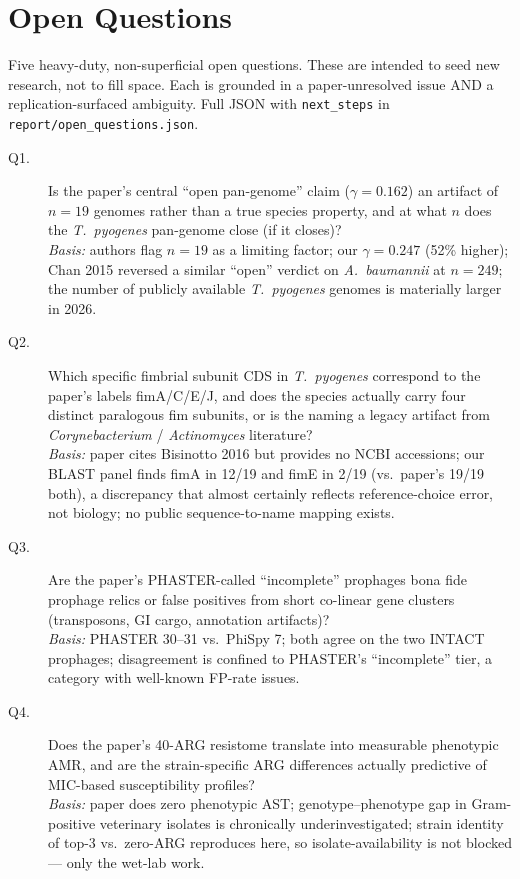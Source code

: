 \documentclass[11pt,a4paper]{article}
\begin{document}
\section{Open Questions}\label{sec:oq}
Five heavy-duty, non-superficial open questions. These are intended to seed new research, not to fill space. Each is grounded in a paper-unresolved issue AND a replication-surfaced ambiguity. Full JSON with \texttt{next\_steps} in \texttt{report/open\_questions.json}.

\begin{description}
\item[Q1.] Is the paper's central ``open pan-genome'' claim ($\gamma = 0.162$) an artifact of $n = 19$ genomes rather than a true species property, and at what $n$ does the \emph{T.\ pyogenes} pan-genome close (if it closes)? \\
\emph{Basis:} authors flag $n = 19$ as a limiting factor; our $\gamma = 0.247$ (52\% higher); Chan 2015 reversed a similar ``open'' verdict on \emph{A.\ baumannii} at $n = 249$; the number of publicly available \emph{T.\ pyogenes} genomes is materially larger in 2026.

\item[Q2.] Which specific fimbrial subunit CDS in \emph{T.\ pyogenes} correspond to the paper's labels fimA/C/E/J, and does the species actually carry four distinct paralogous fim subunits, or is the naming a legacy artifact from \emph{Corynebacterium} / \emph{Actinomyces} literature? \\
\emph{Basis:} paper cites Bisinotto 2016 but provides no NCBI accessions; our BLAST panel finds fimA in 12/19 and fimE in 2/19 (vs.\ paper's 19/19 both), a discrepancy that almost certainly reflects reference-choice error, not biology; no public sequence-to-name mapping exists.

\item[Q3.] Are the paper's PHASTER-called ``incomplete'' prophages bona fide prophage relics or false positives from short co-linear gene clusters (transposons, GI cargo, annotation artifacts)? \\
\emph{Basis:} PHASTER 30--31 vs.\ PhiSpy 7; both agree on the two INTACT prophages; disagreement is confined to PHASTER's ``incomplete'' tier, a category with well-known FP-rate issues.

\item[Q4.] Does the paper's 40-ARG resistome translate into measurable phenotypic AMR, and are the strain-specific ARG differences actually predictive of MIC-based susceptibility profiles? \\
\emph{Basis:} paper does zero phenotypic AST; genotype--phenotype gap in Gram-positive veterinary isolates is chronically underinvestigated; strain identity of top-3 vs.\ zero-ARG reproduces here, so isolate-availability is not blocked --- only the wet-lab work.


\end{description}
\end{document}
